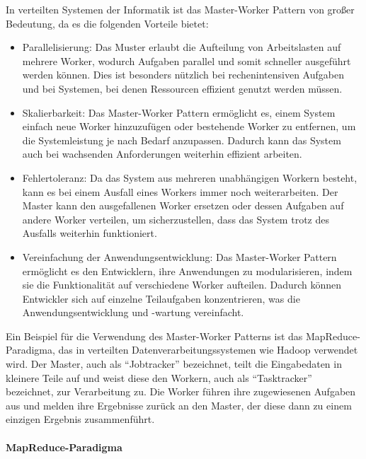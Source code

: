 \documentclass[../vs-script-first-v01.tex]{subfiles}
\begin{document}
In verteilten Systemen der Informatik ist das Master-Worker Pattern von großer Bedeutung, da es die folgenden Vorteile bietet:
\begin{itemize} 
\item Parallelisierung: Das Muster erlaubt die Aufteilung von Arbeitslasten auf mehrere Worker, wodurch Aufgaben parallel und somit schneller ausgeführt werden können. Dies ist besonders nützlich bei rechenintensiven Aufgaben und bei Systemen, bei denen Ressourcen effizient genutzt werden müssen.
\item Skalierbarkeit: Das Master-Worker Pattern ermöglicht es, einem System einfach neue Worker hinzuzufügen oder bestehende Worker zu entfernen, um die Systemleistung je nach Bedarf anzupassen. Dadurch kann das System auch bei wachsenden Anforderungen weiterhin effizient arbeiten.
\item Fehlertoleranz: Da das System aus mehreren unabhängigen Workern besteht, kann es bei einem Ausfall eines Workers immer noch weiterarbeiten. Der Master kann den ausgefallenen Worker ersetzen oder dessen Aufgaben auf andere Worker verteilen, um sicherzustellen, dass das System trotz des Ausfalls weiterhin funktioniert.
\item Vereinfachung der Anwendungsentwicklung: Das Master-Worker Pattern ermöglicht es den Entwicklern, ihre Anwendungen zu modularisieren, indem sie die Funktionalität auf verschiedene Worker aufteilen. Dadurch können Entwickler sich auf einzelne Teilaufgaben konzentrieren, was die Anwendungsentwicklung und -wartung vereinfacht.
\end{itemize}    

Ein Beispiel für die Verwendung des Master-Worker Patterns ist das MapReduce-Paradigma, das in verteilten Datenverarbeitungssystemen wie Hadoop verwendet wird. Der Master, auch als \enquote{Jobtracker} bezeichnet, teilt die Eingabedaten in kleinere Teile auf und weist diese den Workern, auch als \enquote{Tasktracker} bezeichnet, zur Verarbeitung zu. Die Worker führen ihre zugewiesenen Aufgaben aus und melden ihre Ergebnisse zurück an den Master, der diese dann zu einem einzigen Ergebnis zusammenführt.

\label{Woche05}
\paragraph{MapReduce-Paradigma\\\\}
\end{document}
